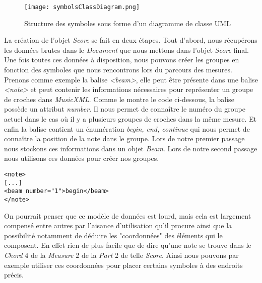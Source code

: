 \begin{figure}[!h]
\centering
\texttt{[image: symbolsClassDiagram.png]}\\[1cm]
\caption{Structure des symboles sous forme d'un diagramme de classe UML}
\end{figure}


\par
La création de l'objet \emph{Score} se fait en deux étapes. Tout d'abord, nous récupérons les données brutes dans le \emph{Document} que nous mettons dans l'objet \emph{Score} final. Une fois toutes ces données à disposition, nous pouvons créer les groupes en fonction des symboles que nous rencontrons lors du parcours des mesures. Prenons comme exemple la balise \emph{<beam>}, elle peut être présente dans une balise \emph{<note>} et peut contenir les informations nécessaires pour représenter un groupe de croches dans \emph{MusicXML}. Comme le montre le code ci-dessous, la balise possède un attribut \emph{number}. Il nous permet de connaître le numéro du groupe actuel dans le cas où il y a plusieurs groupes de croches dans la même mesure. Et enfin la balise contient un énumération \emph{begin, end, continue} qui nous permet de connaître la position de la note dans le groupe. Lors de notre premier passage nous stockons ces informations dans un objet \emph{Beam}. Lors de notre second passage nous utilisons ces données pour créer nos groupes.


\begin{lstlisting}[caption=Exemple d'une balise beam de MusicXML]
<note>
[...]
<beam number="1">begin</beam>
</note>
\end{lstlisting}


\par
On pourrait penser que ce modèle de données est lourd, mais cela est largement compensé entre autres par l'aisance d'utilisation qu'il procure ainsi que la possibilité notamment de déduire les "coordonnées" des éléments qui le composent. En effet rien de plus facile que de dire qu'une note se trouve dans le \emph{Chord} 4 de la \emph{Measure} 2 de la \emph{Part} 2 de telle \emph{Score}. Ainsi nous pouvons par exemple utiliser ces coordonnées pour placer certains symboles à des endroits précis.


